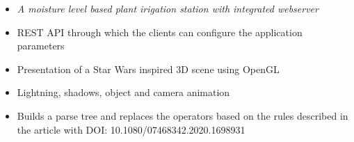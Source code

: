 \begin{footnotesize}
\end{footnotesize}

\divider









\begin{itemize}

\item \textit{A moisture level based plant irigation station with integrated webserver}

\item REST API through which the clients can configure the application parameters

\end{itemize}

\begin{footnotesize}
\end{footnotesize}


\divider






\begin{itemize}

\item Presentation of a Star Wars inspired 3D scene using OpenGL

\item Lightning, shadows, object and camera animation

\end{itemize}

\begin{footnotesize}
\end{footnotesize}


\divider





\begin{itemize}

\item Builds a parse tree and replaces the operators based on the rules described in the article with DOI: 10.1080/07468342.2020.1698931

\end{itemize}

